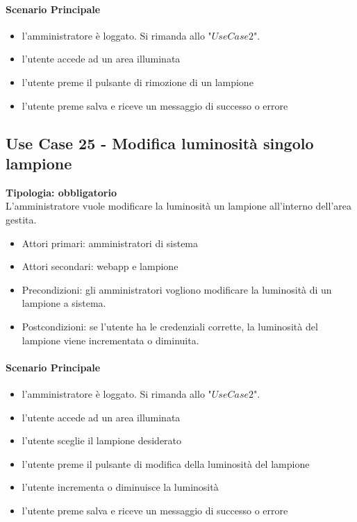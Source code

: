 \documentclass[12pt]{article}
\begin{document}
\paragraph{Scenario Principale}
\begin{itemize}
	\item l'amministratore è loggato. Si rimanda allo "$Use Case 2$".
	\item l'utente accede ad un area illuminata
	\item l'utente preme il pulsante di rimozione di un lampione
	\item l'utente preme salva e riceve un messaggio di successo o errore
\end{itemize}

\subsection{Use Case 25 - Modifica luminosità singolo lampione}
\textbf{Tipologia: obbligatorio}\\
L'amministratore vuole modificare la luminosità un lampione all'interno dell'area gestita.
\begin{itemize}
	\item Attori primari: amministratori di sistema
	\item Attori secondari: webapp e lampione
	\item Precondizioni: gli amministratori vogliono modificare la luminosità di un lampione a sistema.\\
	\item Postcondizioni: se l'utente ha le credenziali corrette, la luminosità del lampione viene incrementata o diminuita.
\end{itemize}
\paragraph{Scenario Principale}
\begin{itemize}
	\item l'amministratore è loggato. Si rimanda allo "$Use Case 2$".
	\item l'utente accede ad un area illuminata
	\item l'utente sceglie il lampione desiderato
	\item l'utente preme il pulsante di modifica della luminosità del lampione
	\item l'utente incrementa o diminuisce la luminosità
	\item l'utente preme salva e riceve un messaggio di successo o errore
\end{itemize}
\end{document}
